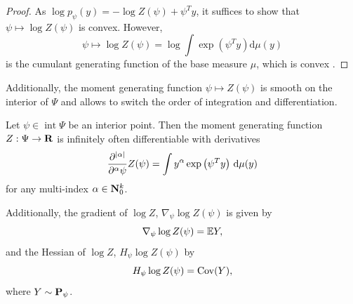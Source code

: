 \begin{proof}
    As $\log p_{\psi}(y) = - \log Z(\psi) + \psi^{T} y$, it suffices to show that $\psi \mapsto \log Z(\psi)$ is convex. However, 
    $$\psi \mapsto \log Z(\psi) = \log \int \exp \left( \psi^{T}y \right) \mathrm d \mu(y)$$ is the cumulant generating function of the base measure $\mu$, which is convex \citep[p. 144f]{Billingsley1995Probabilitya}.
\end{proof}

Additionally, the moment generating function $\psi \mapsto Z(\psi)$ is smooth on the interior of $\Psi$ and allows to switch the order of integration and differentiation.
\begin{theorem}
    \label{thm:logZsmooth}
    Let $\psi \in \operatorname{int} \Psi$ be an interior point. Then the moment generating function $Z: \Psi \to \R$ is infinitely often differentiable with derivatives 
    $$
        \frac{\partial^{\lvert \alpha \rvert}}{\partial^{\alpha}\psi} Z(\psi) = \int y^{\alpha} \exp \left( \psi^{T} y \right) \d \mu(y)
    $$
    for any multi-index $\alpha \in \N_{0}^{k}$.

    Additionally, the gradient of $\log Z$, $\nabla_{\psi} \log Z(\psi)$ is given by
    $$
        \nabla_{\psi} \log Z(\psi) = \E Y,
    $$
    and the Hessian of $\log Z$, $H_{\psi} \log Z(\psi)$ by
    $$
        H_{\psi} \log Z(\psi) = \cov (Y),
    $$
    where $Y \sim \P_{\psi}$.
    
\end{theorem}

